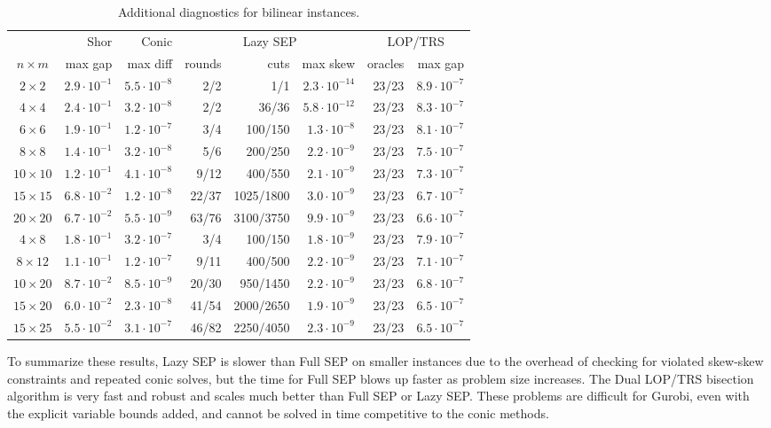 \documentclass[11pt]{article}
\begin{document}
\begin{table}[htbp]
\centering
\caption{Additional diagnostics for bilinear instances.}
\label{tab:bilinear_diagnostics}
\begingroup
\setlength{\tabcolsep}{2.5pt}
\scriptsize
\begin{tabular}{c|r|r|r r r|r r}
\hline
& Shor & Conic & \multicolumn{3}{c|}{Lazy SEP} & \multicolumn{2}{c}{LOP/TRS} \\
$n\times m$ & max gap & max diff & rounds & cuts & max skew & oracles & max gap \\
\hline
$2\times 2$ & $2.9\cdot 10^{-1}$ & $5.5\cdot 10^{-8}$ & 2/2 & 1/1 & $2.3\cdot 10^{-14}$ & 23/23 & $8.9\cdot 10^{-7}$ \\
$4\times 4$ & $2.4\cdot 10^{-1}$ & $3.2\cdot 10^{-8}$ & 2/2 & 36/36 & $5.8\cdot 10^{-12}$ & 23/23 & $8.3\cdot 10^{-7}$ \\
$6\times 6$ & $1.9\cdot 10^{-1}$ & $1.2\cdot 10^{-7}$ & 3/4 & 100/150 & $1.3\cdot 10^{-8}$ & 23/23 & $8.1\cdot 10^{-7}$ \\
$8\times 8$ & $1.4\cdot 10^{-1}$ & $3.2\cdot 10^{-8}$ & 5/6 & 200/250 & $2.2\cdot 10^{-9}$ & 23/23 & $7.5\cdot 10^{-7}$ \\
$10\times 10$ & $1.2\cdot 10^{-1}$ & $4.1\cdot 10^{-8}$ & 9/12 & 400/550 & $2.1\cdot 10^{-9}$ & 23/23 & $7.3\cdot 10^{-7}$ \\
$15\times 15$ & $6.8\cdot 10^{-2}$ & $1.2\cdot 10^{-8}$ & 22/37 & 1025/1800 & $3.0\cdot 10^{-9}$ & 23/23 & $6.7\cdot 10^{-7}$ \\
$20\times 20$ & $6.7\cdot 10^{-2}$ & $5.5\cdot 10^{-9}$ & 63/76 & 3100/3750 & $9.9\cdot 10^{-9}$ & 23/23 & $6.6\cdot 10^{-7}$ \\
\hline
$4\times 8$ & $1.8\cdot 10^{-1}$ & $3.2\cdot 10^{-7}$ & 3/4 & 100/150 & $1.8\cdot 10^{-9}$ & 23/23 & $7.9\cdot 10^{-7}$ \\
$8\times 12$ & $1.1\cdot 10^{-1}$ & $1.2\cdot 10^{-7}$ & 9/11 & 400/500 & $2.2\cdot 10^{-9}$ & 23/23 & $7.1\cdot 10^{-7}$ \\
$10\times 20$ & $8.7\cdot 10^{-2}$ & $8.5\cdot 10^{-9}$ & 20/30 & 950/1450 & $2.2\cdot 10^{-9}$ & 23/23 & $6.8\cdot 10^{-7}$ \\
$15\times 20$ & $6.0\cdot 10^{-2}$ & $2.3\cdot 10^{-8}$ & 41/54 & 2000/2650 & $1.9\cdot 10^{-9}$ & 23/23 & $6.5\cdot 10^{-7}$ \\
$15\times 25$ & $5.5\cdot 10^{-2}$ & $3.1\cdot 10^{-7}$ & 46/82 & 2250/4050 & $2.3\cdot 10^{-9}$ & 23/23 & $6.5\cdot 10^{-7}$ \\
\hline
\hline
\end{tabular}
\endgroup
\end{table}

To summarize these results, Lazy SEP is slower than Full SEP on smaller
instances due to the overhead of checking for violated skew-skew constraints
and repeated conic solves, but the time for Full SEP blows up faster as
problem size increases.  The Dual LOP/TRS bisection algorithm is very fast
and robust and scales much better than Full SEP or Lazy SEP.  These problems
are difficult for Gurobi, even with the explicit variable bounds added, and
cannot be solved in time competitive to the conic methods.
\end{document}
